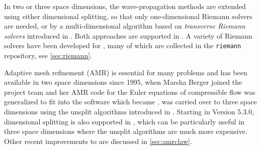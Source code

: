 In two or three space dimensions, the wave-propagation methods
are extended using either dimensional splitting, so that only
one-dimensional Riemann solvers are needed, or by a multi-dimensional
algorithm based on {\em transverse Riemann solvers} introduced in
\cite{rjl:wpalg}.  Both approaches are supported in \clawpack.
A variety of Riemann solvers have been developed for \clawpack, many
of which are collected in the \texttt{riemann} repository, see
\cref{sec:riemann}.

Adaptive mesh refinement (AMR) is essential for many problems and has been
available in two space dimensions since 1995, when Marsha Berger
joined the project team and her AMR code for the Euler equations of
compressible flow was generalized to fit into the software which
became \amrclaw \cite{Berger:1998ia},  \amrclaw was carried over to
three space dimensions using the unsplit algorithms introduced in
\cite{jol-rjl:3d}.  Starting in Version 5.3.0, dimensional splitting
is also supported in \amrclaw, which can be particularly useful in
three space dimensions where the unsplit algorithms are much more
expensive.  Other recent improvements to \amrclaw are discussed in
\cref{sec:amrclaw}.

